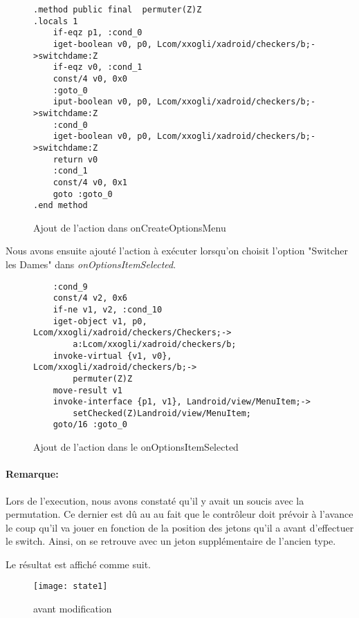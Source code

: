 \begin{figure}[!hp]
\begin{verbatim}
.method public final  permuter(Z)Z
.locals 1
    if-eqz p1, :cond_0
    iget-boolean v0, p0, Lcom/xxogli/xadroid/checkers/b;->switchdame:Z
    if-eqz v0, :cond_1
    const/4 v0, 0x0
    :goto_0
    iput-boolean v0, p0, Lcom/xxogli/xadroid/checkers/b;->switchdame:Z
    :cond_0
    iget-boolean v0, p0, Lcom/xxogli/xadroid/checkers/b;->switchdame:Z
    return v0
    :cond_1
    const/4 v0, 0x1
    goto :goto_0
.end method
\end{verbatim}
    \caption{Ajout de l'action dans onCreateOptionsMenu}
\end{figure}

Nous avons ensuite ajouté l'action à exécuter lorsqu'on choisit l'option "Switcher les Dames" dans \textit{onOptionsItemSelected}.

\begin{figure}[!hp]
\begin{verbatim}
    :cond_9
    const/4 v2, 0x6
    if-ne v1, v2, :cond_10
    iget-object v1, p0, Lcom/xxogli/xadroid/checkers/Checkers;->
		a:Lcom/xxogli/xadroid/checkers/b;
    invoke-virtual {v1, v0}, Lcom/xxogli/xadroid/checkers/b;->
		permuter(Z)Z
    move-result v1
    invoke-interface {p1, v1}, Landroid/view/MenuItem;->
		setChecked(Z)Landroid/view/MenuItem;
    goto/16 :goto_0
\end{verbatim}
    \caption{Ajout de l'action dans le onOptionsItemSelected}
\end{figure}

\paragraph{Remarque:}
Lors de l'execution, nous avons constaté qu'il y avait un soucis avec la permutation.
Ce dernier est dû au au fait que le contrôleur doit prévoir à l'avance le coup qu'il va jouer en fonction
de la position des jetons qu'il a avant d'effectuer le switch.
Ainsi, on se retrouve avec un jeton supplémentaire de l'ancien type.


Le résultat est affiché comme suit.

\begin{figure}[h!]
	      \begin{center}
			\texttt{[image: state1]}
	      \end{center}
	\caption{avant modification}
\end{figure}

